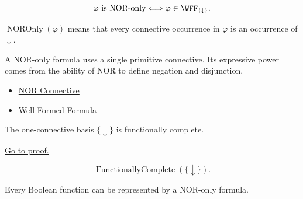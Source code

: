\begin{remark*}
\[
\varphi\text{ is NOR-only}
\Longleftrightarrow
\varphi\in\WFF_{\{\downarrow\}}.
\]
\end{remark*}

\begin{remark*}
\(\operatorname{NOROnly}(\varphi)\) means that every connective occurrence in
\(\varphi\) is an occurrence of \(\downarrow\).
\end{remark*}

\begin{remark*}[Interpretation]
A NOR-only formula uses a single primitive connective. Its expressive power
comes from the ability of NOR to define negation and disjunction.
\end{remark*}

\begin{dependencies}
\begin{itemize}
  \item \hyperref[def:nor-connective-propositional-logic]{NOR Connective}
  \item \hyperref[def:well-formed-formula]{Well-Formed Formula}
\end{itemize}
\end{dependencies}

\begin{tcolorbox}[colback=thmbox, colframe=thmborder, arc=2pt,
  left=6pt, right=6pt, top=4pt, bottom=4pt,
  title={\small\textbf{Theorem (NOR is Functionally Complete)}},
  fonttitle=\small\bfseries]
\begin{theorem}
\label{thm:nor-functionally-complete-propositional-logic}
The one-connective basis \(\{\downarrow\}\) is functionally complete.

\noindent\hyperref[prf:nor-functionally-complete-propositional-logic]{Go to proof.}
\end{theorem}
\end{tcolorbox}

\begin{remark*}
\[
\operatorname{FunctionallyComplete}(\{\downarrow\}).
\]
\end{remark*}

\begin{remark*}
Every Boolean function can be represented by a NOR-only formula.
\end{remark*}

